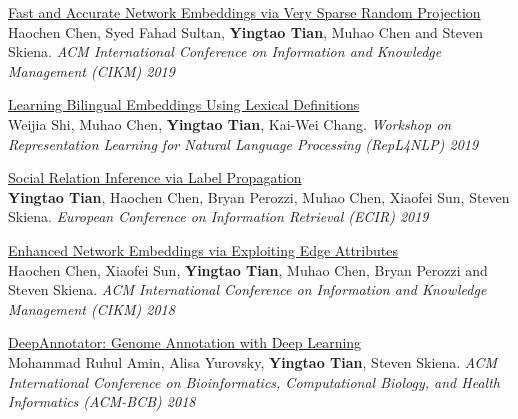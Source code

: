 \documentclass[line,margin]{cv}
\begin{document}
\begin{resume}
{  \begin{samepage}
  \href{https://arxiv.org/abs/1908.11512}{Fast and Accurate Network Embeddings via Very Sparse Random Projection}\\
  Haochen Chen, Syed Fahad Sultan, \textbf{Yingtao Tian}, Muhao Chen and Steven Skiena. \emph{ACM International Conference on Information and Knowledge Management (CIKM) 2019}
  \par\end{samepage}

  \begin{samepage}
  \href{https://www.aclweb.org/anthology/W19-4316/}{Learning Bilingual Embeddings Using Lexical Definitions}\\
  Weijia Shi, Muhao Chen, \textbf{Yingtao Tian}, Kai-Wei Chang. \emph{Workshop on Representation Learning for Natural Language Processing (RepL4NLP) 2019}
  \par\end{samepage}

  \begin{samepage}
  \href{http://www.mlgworkshop.org/2018/papers/MLG2018\_paper\_58.pdf}{Social Relation Inference via Label Propagation}\\
  \textbf{Yingtao Tian}, Haochen Chen, Bryan Perozzi, Muhao Chen, Xiaofei Sun, Steven Skiena. \emph{European Conference on Information Retrieval (ECIR) 2019}
  \par\end{samepage}

  \begin{samepage}
  \href{https://arxiv.org/abs/1809.05124}{Enhanced Network Embeddings via Exploiting Edge Attributes}\\
  Haochen Chen, Xiaofei Sun, \textbf{Yingtao Tian}, Muhao Chen, Bryan Perozzi and Steven Skiena. \emph{ACM International Conference on Information and Knowledge Management (CIKM) 2018}
  \par\end{samepage}

  \begin{samepage}
  \href{https://dl.acm.org/citation.cfm?id=3233577}{DeepAnnotator: Genome Annotation with Deep Learning}\\
  Mohammad Ruhul Amin, Alisa Yurovsky, \textbf{Yingtao Tian}, Steven Skiena. \emph{ACM International Conference on Bioinformatics, Computational Biology, and Health Informatics (ACM-BCB) 2018}
  \par\end{samepage}

}
\end{resume}
\end{document}

